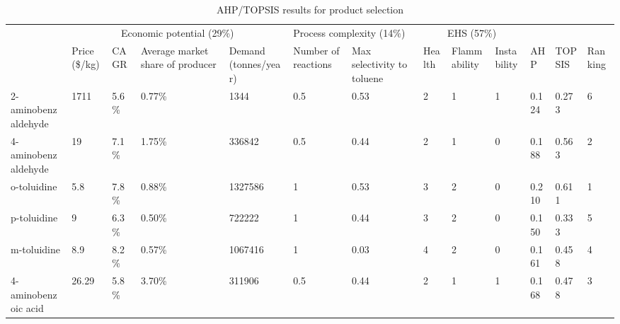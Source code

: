 \begin{table}[H]
\centering
    \caption{AHP/TOPSIS results for product selection}
    \label{tab:product}
\begin{tabular}{p{3cm}|p{1cm}|p{1cm}|p{1cm}|p{1cm}|p{1cm}|p{1cm}|p{1cm}|p{1cm}|p{1cm}|p{1cm}|p{1cm}|p{1cm}}
\cline{2-13}
                                          & \multicolumn{4}{c|}{Economic potential   (29\%)}                                & \multicolumn{2}{p{2cm}|}{Process   complexity (14\%)} & \multicolumn{3}{c|}{EHS (57\%)}     &                       &                          &                           \\ \cline{2-10}
                                          & Price (\$/kg) & CAGR  & Average market share of producer & Demand (tonnes/year) & Number of reactions & Max selectivity to toluene & Health & Flammability & Instability & \multirow{-2}{*}{AHP} & \multirow{-2}{*}{TOPSIS} & \multirow{-2}{*}{Ranking} \\ \hline
\multicolumn{1}{|l|}{2-aminobenzaldehyde} & 1711          & 5.6\% & 0.77\%                           & 1344                 & 0.5                 & 0.53                       & 2      & 1            & 1           & 0.124                 & 0.273                    & 6                         \\ \hline
\multicolumn{1}{|l|}{4-aminobenzaldehyde} & 19            & 7.1\% & 1.75\%                           & 336842               & 0.5                 & 0.44                       & 2      & 1            & 0           & 0.188                 & 0.563                    & \cellcolor[HTML]{9AFF99}2 \\ \hline
\multicolumn{1}{|l|}{o-toluidine}         & 5.8           & 7.8\% & 0.88\%                           & 1327586              & 1                   & 0.53                       & 3      & 2            & 0           & 0.210                 & 0.611                    & \cellcolor[HTML]{9AFF99}1 \\ \hline
\multicolumn{1}{|l|}{p-toluidine}         & 9             & 6.3\% & 0.50\%                           & 722222               & 1                   & 0.44                       & 3      & 2            & 0           & 0.150                 & 0.333                    & 5                         \\ \hline
\multicolumn{1}{|l|}{m-toluidine}         & 8.9           & 8.2\% & 0.57\%                           & 1067416              & 1                   & 0.03                       & 4      & 2            & 0           & 0.161                 & 0.458                    & 4                         \\ \hline
\multicolumn{1}{|l|}{4-aminobenzoic acid} & 26.29         & 5.8\% & 3.70\%                           & 311906               & 0.5                 & 0.44                       & 2      & 1            & 1           & 0.168                 & 0.478                    & \cellcolor[HTML]{9AFF99}3 \\ \hline
\end{tabular}
\end{table}


